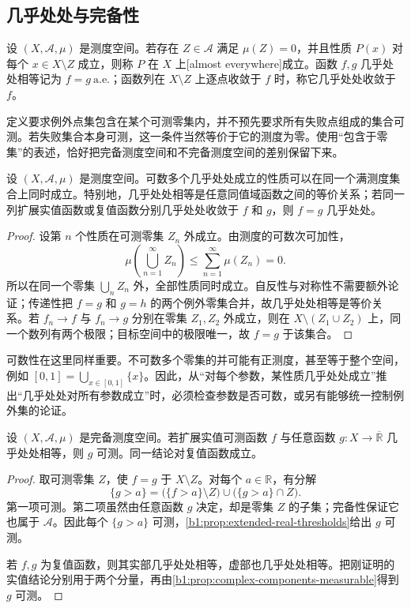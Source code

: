 \subsection{几乎处处与完备性}
\label{b1:subsec:040204}

\begin{definition}
\label{b1:def:almost-everywhere}
设 \((X,\mathcal A,\mu)\) 是测度空间。若存在 \(Z\in\mathcal A\) 满足 \(\mu(Z)=0\)，并且性质 \(P(x)\) 对每个 \(x\in X\setminus Z\) 成立，则称 \(P\) 在 \(X\) 上[almost everywhere]成立。函数 \(f,g\) 几乎处处相等记为 \(f=g\ \mathrm{a.e.}\)；函数列在 \(X\setminus Z\) 上逐点收敛于 \(f\) 时，称它几乎处处收敛于 \(f\)。
\end{definition}

定义要求例外点集包含在某个可测零集内，并不预先要求所有失败点组成的集合可测。若失败集合本身可测，这一条件当然等价于它的测度为零。使用“包含于零集”的表述，恰好把完备测度空间和不完备测度空间的差别保留下来。

\begin{proposition}
\label{b1:prop:countable-ae-properties}
设 \((X,\mathcal A,\mu)\) 是测度空间。可数多个几乎处处成立的性质可以在同一个满测度集合上同时成立。特别地，几乎处处相等是任意同值域函数之间的等价关系；若同一列扩展实值函数或复值函数分别几乎处处收敛于 \(f\) 和 \(g\)，则 \(f=g\) 几乎处处。
\end{proposition}
\begin{proof}
设第 \(n\) 个性质在可测零集 \(Z_n\) 外成立。由测度的可数次可加性，
\[
\mu\left(\bigcup_{n=1}^{\infty}Z_n\right)
\leq\sum_{n=1}^{\infty}\mu(Z_n)=0.
\]
所以在同一个零集 \(\bigcup_nZ_n\) 外，全部性质同时成立。自反性与对称性不需要额外论证；传递性把 \(f=g\) 和 \(g=h\) 的两个例外零集合并，故几乎处处相等是等价关系。若 \(f_n\to f\) 与 \(f_n\to g\) 分别在零集 \(Z_1,Z_2\) 外成立，则在 \(X\setminus(Z_1\cup Z_2)\) 上，同一个数列有两个极限；目标空间中的极限唯一，故 \(f=g\) 于该集合。
\end{proof}

可数性在这里同样重要。不可数多个零集的并可能有正测度，甚至等于整个空间，例如
\([0,1]=\bigcup_{x\in[0,1]}\{x\}\)。因此，从“对每个参数，某性质几乎处处成立”推出“几乎处处对所有参数成立”时，必须检查参数是否可数，或另有能够统一控制例外集的论证。

\begin{theorem}
\label{b1:thm:complete-null-modification}
设 \((X,\mathcal A,\mu)\) 是完备测度空间。若扩展实值可测函数 \(f\) 与任意函数 \(g:X\rightarrow\overline{\mathbb R}\) 几乎处处相等，则 \(g\) 可测。同一结论对复值函数成立。
\end{theorem}
\begin{proof}
取可测零集 \(Z\)，使 \(f=g\) 于 \(X\setminus Z\)。对每个 \(a\in\mathbb R\)，有分解
\[
\{g>a\}
=\bigl(\{f>a\}\setminus Z\bigr)
\cup\bigl(\{g>a\}\cap Z\bigr).
\]
第一项可测。第二项虽然由任意函数 \(g\) 决定，却是零集 \(Z\) 的子集；完备性保证它也属于 \(\mathcal A\)。因此每个 \(\{g>a\}\) 可测，\cref{b1:prop:extended-real-thresholds}给出 \(g\) 可测。

若 \(f,g\) 为复值函数，则其实部几乎处处相等，虚部也几乎处处相等。把刚证明的实值结论分别用于两个分量，再由\cref{b1:prop:complex-components-measurable}得到 \(g\) 可测。
\end{proof}

